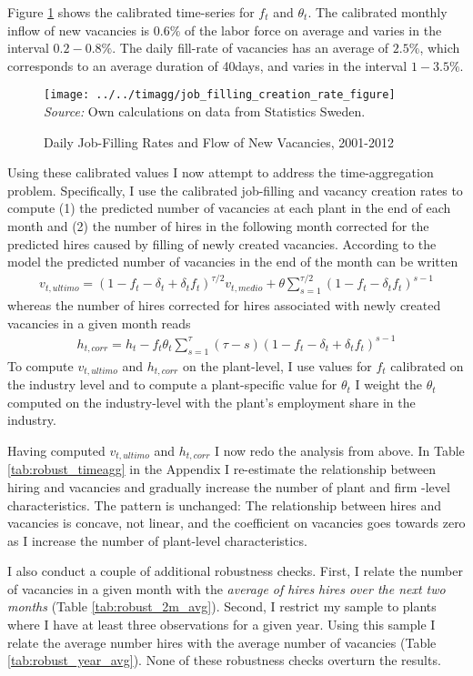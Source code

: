 Figure \ref{fig:filling_rates} shows the calibrated time-series for $f_t$ and $\theta_t$. The calibrated monthly inflow of new vacancies is $0.6 \%$ of the labor force on average and varies in the interval $0.2-0.8 \%$. The daily fill-rate of vacancies has an average of $2.5 \%$, which corresponds to an average duration of 40days, and varies in the interval $1-3.5\%$. 

\begin{figure}[h]
\centering
\caption{Daily Job-Filling Rates and Flow of New Vacancies, 2001-2012}
\texttt{[image: ../../timagg/job\_filling\_creation\_rate\_figure]}
\flushleft
\footnotesize{\emph{Source:} Own calculations on data from Statistics Sweden.}
\label{fig:filling_rates}
\end{figure}

Using these calibrated values I now attempt to address the time-aggregation problem. Specifically, I use the calibrated job-filling  and vacancy creation rates to compute (1) the predicted number of vacancies at each plant in the end of each month and (2) the number of hires in the following month corrected for the predicted hires caused by filling of newly created vacancies. According to the model the predicted number of vacancies in the end of the month can be written
\begin{align}
v_{t,ultimo}=\left( 1-f_t-\delta_t+\delta_t f_t \right)^{\tau/2} v_{t,medio} + \theta \sum_{s=1}^{\tau/2} \left( 1-f_t-\delta_t f_t \right)^{s-1}
\end{align}
whereas the number of hires corrected for hires associated with newly created vacancies in a given month reads
\begin{align}
h_{t,corr}=h_t-f_t \theta_t \sum_{s=1}^{\tau} \left( \tau- s\right) \left( 1-f_t-\delta_t+\delta_t f_t \right)^{s-1}
\end{align}
To compute $v_{t,ultimo}$ and $h_{t,corr}$ on the plant-level, I use values for $f_t$ calibrated on the industry level and to compute a plant-specific value for $\theta_t$ I weight the $\theta_t$ computed on the industry-level with the plant's employment share in the industry.

Having computed $v_{t,ultimo}$ and $h_{t,corr}$ I now redo the analysis from above. In Table \ref{tab:robust_timeagg} in the Appendix I re-estimate the relationship between hiring and vacancies and gradually increase the number of plant and firm -level characteristics. The pattern is unchanged: The relationship between hires and vacancies is concave, not linear, and the coefficient on vacancies goes towards zero as I increase the number of plant-level characteristics. 

I also conduct a couple of additional robustness checks. First,  I relate the number of vacancies in a given month with the \emph{average of hires hires over the next two months} (Table \ref{tab:robust_2m_avg}). Second, I restrict my sample to plants where I have at least three observations for a given year. Using this sample I relate the average number hires with the average number of vacancies (Table  \ref{tab:robust_year_avg}). None of these robustness checks overturn the results.